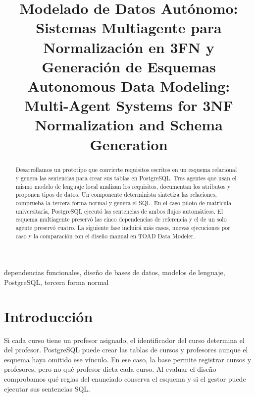 \documentclass[conference]{IEEEtran}
\begin{document}
\title{Modelado de Datos Autónomo: Sistemas Multiagente para Normalización en 3FN y Generación de Esquemas\\
{\footnotesize Autonomous Data Modeling: Multi-Agent Systems for 3NF Normalization and Schema Generation}}

\author{
}

\maketitle

\begin{abstract}
Desarrollamos un prototipo que convierte requisitos escritos en un esquema relacional y genera las sentencias para crear sus tablas en PostgreSQL. Tres agentes que usan el mismo modelo de lenguaje local analizan los requisitos, documentan los atributos y proponen tipos de datos. Un componente determinista sintetiza las relaciones, comprueba la tercera forma normal y genera el SQL. En el caso piloto de matrícula universitaria, PostgreSQL ejecutó las sentencias de ambos flujos automáticos. El esquema multiagente preservó las cinco dependencias de referencia y el de un solo agente preservó cuatro. La siguiente fase incluirá más casos, nuevas ejecuciones por caso y la comparación con el diseño manual en TOAD Data Modeler.
\end{abstract}

\begin{IEEEkeywords}
dependencias funcionales, diseño de bases de datos, modelos de lenguaje, PostgreSQL, tercera forma normal
\end{IEEEkeywords}

\section{Introducción}

Si cada curso tiene un profesor asignado, el identificador del curso determina el del profesor. PostgreSQL puede crear las tablas de cursos y profesores aunque el esquema haya omitido ese vínculo. En ese caso, la base permite registrar cursos y profesores, pero no qué profesor dicta cada curso. Al evaluar el diseño comprobamos qué reglas del enunciado conserva el esquema y si el gestor puede ejecutar sus sentencias SQL.
\end{document}
